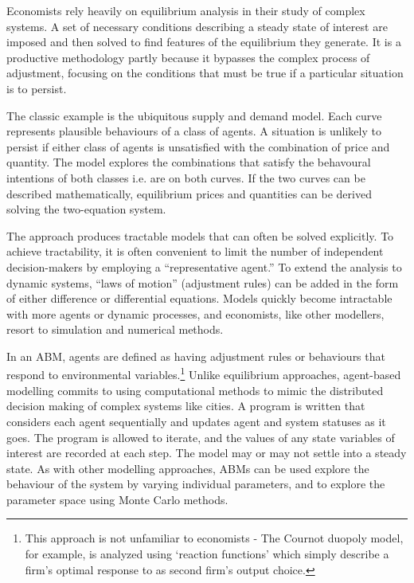 Economists rely heavily on equilibrium analysis in their study of complex systems. 
A set of necessary conditions describing a steady state of interest are imposed and then solved to find features of the equilibrium they generate. It is a productive methodology partly because it  bypasses the complex process of adjustment, focusing on the conditions that must be true if a particular situation is to persist.

The classic example is the ubiquitous supply and demand model. Each curve represents plausible behaviours of a class of agents. A situation is unlikely to persist if either class of agents is unsatisfied with the combination of price and quantity. The model explores the combinations that satisfy the behavoural intentions of both classes i.e. are on both curves. If the two curves can be described mathematically, equilibrium prices and quantities can be derived solving the two-equation system.

The approach produces tractable models that can often be solved explicitly. To achieve tractability, it is often convenient 
to limit the number of independent decision-makers by employing a ``representative agent.'' To extend the analysis to dynamic systems, ``laws of motion'' (adjustment rules) can be added in the form of either difference or differential equations.  Models quickly become intractable with more agents or dynamic 
processes, and economists, like other modellers, resort to simulation 
and numerical methods. 

In an \gls{ABM}, agents are defined as having adjustment rules or behaviours that respond to environmental variables.\footnote{This approach is not unfamiliar to economists - The Cournot duopoly model, for example, is analyzed using `reaction functions' which simply describe a firm's optimal response to as second firm's output choice.} 
Unlike equilibrium approaches, agent-based modelling commits to using computational methods to mimic the distributed decision making of complex systems like cities. A program is written that considers each agent sequentially and updates agent and system statuses as it goes. The program is allowed to iterate, and the values of any state variables of interest are recorded at each step. The model may or may not settle into a steady state. As with other modelling approaches, ABMs can be used explore the behaviour of the system by varying individual parameters, and to explore the parameter space using Monte Carlo methods.

